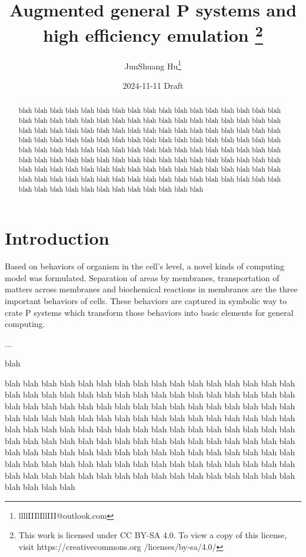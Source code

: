 \documentclass[9pt,a4paper,twoside]{article}
\title{
    Augmented general P systems and high efficiency emulation
    \footnote{
        This work is licensed under CC BY-SA 4.0. To view a copy of this license, visit 
        https://creativecommons.org /licenses/by-sa/4.0/
    }
}
\date{2024-11-11 Draft}
\author{JunShuang Hu\footnote{llllIIIlIllIII@outlook.com}}
\begin{document}
    
    \maketitle
    
    \begin{abstract}
        blah blah blah blah blah blah blah blah blah blah blah blah blah blah blah blah blah blah blah blah blah blah blah blah blah blah blah blah blah blah blah blah blah blah blah blah blah blah blah blah blah blah blah blah blah blah blah blah blah blah blah blah blah blah blah blah blah blah blah blah blah blah blah blah blah blah blah blah blah blah blah blah blah blah blah blah blah blah blah blah blah blah blah blah blah blah blah blah blah blah blah blah blah blah blah blah blah blah blah blah blah blah blah blah blah blah blah blah blah blah blah blah blah blah blah blah blah blah blah blah blah blah blah blah blah blah blah blah blah blah blah blah blah blah blah blah blah blah blah blah blah blah blah blah blah blah blah blah 
    \end{abstract}
    
    \section{Introduction}
    
        Based on behaviors of organism in the cell's level, a novel kinds of computing model was formulated. Separation of areas by membranes,
        transportation of matters across membranes and biochemical reactions in membranes are the three important behaviors of cells. 
        These behaviors are captured in symbolic way to crate P systems which transform those behaviors into basic elements for general computing.
        
        ...  
        
        blah
        
        blah blah blah blah blah blah blah blah blah blah blah blah blah blah blah blah blah blah blah blah blah blah blah blah blah blah blah blah blah blah blah blah blah blah blah blah blah blah blah blah blah blah blah blah blah blah blah blah blah blah blah blah blah blah blah blah blah blah blah blah blah blah blah blah blah blah blah blah blah blah blah blah blah blah blah blah blah blah blah blah blah blah blah blah blah blah blah blah blah blah blah blah blah blah blah blah blah blah blah blah blah blah blah blah blah blah blah blah blah blah blah blah blah blah blah blah blah blah blah blah blah blah blah blah blah blah blah blah blah blah blah blah blah blah blah blah blah blah blah blah blah blah blah blah blah blah blah blah 
\end{document}
